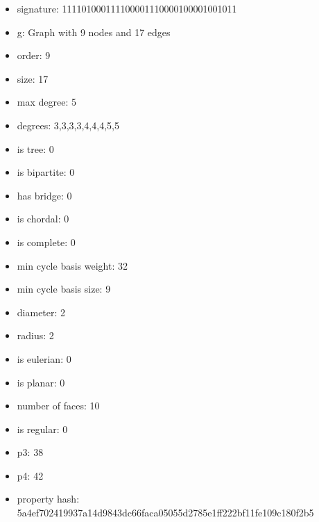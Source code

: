 \newpage
\begin{figure}
\end{figure}
\begin{itemize}
\item signature: 111101000111100001110000100001001011
\item g: Graph with 9 nodes and 17 edges
\item order: 9
\item size: 17
\item max degree: 5
\item degrees: 3,3,3,3,4,4,4,5,5
\item is tree: 0
\item is bipartite: 0
\item has bridge: 0
\item is chordal: 0
\item is complete: 0
\item min cycle basis weight: 32
\item min cycle basis size: 9
\item diameter: 2
\item radius: 2
\item is eulerian: 0
\item is planar: 0
\item number of faces: 10
\item is regular: 0
\item p3: 38
\item p4: 42
\item property hash: 5a4ef702419937a14d9843dc66faca05055d2785e1ff222bf11fe109c180f2b5
\end{itemize}
